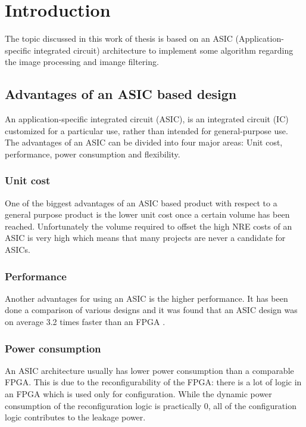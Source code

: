 \chapter{Introduction}
The topic discussed in this work of thesis is based on an ASIC (Application-specific integrated circuit) architecture to implement some algorithm regarding the image processing and imange filtering.\\
\section{Advantages of an ASIC based design}
An application-specific integrated circuit (ASIC), is an integrated circuit (IC) customized for a particular use, rather than intended for general-purpose use.\\
The advantages of an ASIC can be divided into four major areas: Unit
cost, performance, power consumption and flexibility. 
\subsection{Unit cost}
One of the biggest advantages of an ASIC based product with respect to a general purpose product is the lower unit cost once a certain
volume has been reached. Unfortunately the volume required to offset
the high NRE costs of an ASIC is very high which means that many
projects are never a candidate for ASICs.\cite{asci0}\\


\subsection{Performance}
Another advantages for using an ASIC is the higher performance. It has been done a comparison of various designs and it was found that an ASIC design was on average 3.2
times faster than an FPGA \cite{asic2}. \\

\subsection{Power consumption}
An ASIC architecture usually has lower power consumption
than a comparable FPGA. 
This is due to the reconfigurability of the FPGA: there is a lot of logic in an FPGA which is used only for configuration.
While the dynamic power consumption of the reconfiguration logic
is practically 0, all of the configuration logic contributes to the leakage
power.\cite{asci0}\\
